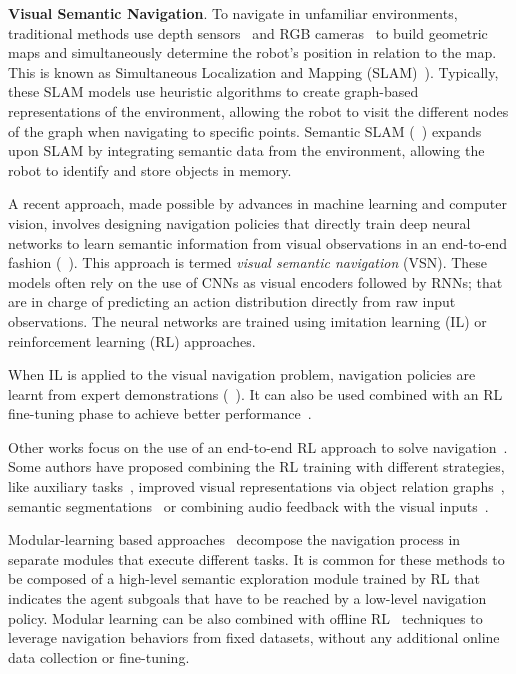 
\textbf{Visual Semantic Navigation}.
To navigate in unfamiliar environments, traditional methods use depth sensors~\cite{newcombe2011, thrun2001} and RGB cameras~\cite{jones2011, sattler2018} to build geometric maps and simultaneously determine the robot's position in relation to the map.
This is known as Simultaneous Localization and Mapping (SLAM)~\cite{Kazerouni2022, campos2021, labbe2022}).
Typically, these SLAM models use heuristic algorithms to create graph-based representations of the environment, allowing the robot to visit the different nodes of the graph when navigating to specific points.
Semantic SLAM (\eg~\cite{zhang2018, rosinol2020, jin2023}) expands upon SLAM by integrating semantic data from the environment, allowing the robot to identify and store objects in memory.

A recent approach, made possible by advances in machine learning and computer vision, involves designing navigation policies that directly train deep neural networks to learn semantic information from visual observations in an end-to-end fashion (\eg~\cite{ramrakhya2022,yadav2022, gutierrez2019, khandelwal2022, chaplot2020,chang2020}).
This approach is termed \textit{visual semantic navigation} (VSN).
These models often rely on the use of CNNs as visual encoders followed by RNNs; that are in charge of predicting an action distribution directly from raw input observations.
The neural networks are trained using imitation learning (IL) or reinforcement learning (RL) approaches.

When IL is applied to the visual navigation problem, navigation policies are learnt from expert demonstrations (\eg~\cite{ramrakhya2022,yadav2022}).
It can also be used combined with an RL fine-tuning phase to achieve better performance~\cite{ramrakhya2023}.

Other works focus on the use of an end-to-end RL approach to solve \objnav navigation~\cite{zhu2017, gutierrez2019, wijmans2020, khandelwal2022, Liu2022, Yadav2023OVRLV2AS, Xu2024DeepRL, YokoyamaHM3DOVONAD}.
Some authors have proposed combining the RL training with different strategies, like auxiliary tasks~\cite{ye2021}, improved visual representations via object relation graphs~\cite{yang2018}, semantic segmentations~\cite{Mousavian2018} or combining audio feedback with the visual inputs~\cite{Wang2023, Kondoh2023MultigoalAN}.

Modular-learning based approaches~\cite{chaplot2020, chang2020, skillfusion, Li2023RDDRLAR, zhou2022improving, Cai2024DGMemLV, Kang2024HSPNavHS, Wang2023ProbableOL, Wasserman2023ExploitationGuidedEF, Yokoyama2023VLFMVF} decompose the navigation process in separate modules that execute different tasks.
It is common for these methods to be composed of a high-level semantic exploration module trained by RL that indicates the agent subgoals that have to be reached by a low-level navigation policy.
Modular learning can be also combined with offline RL~\cite{shah2022} techniques to leverage navigation behaviors from fixed datasets, without any additional online data collection or fine-tuning.

